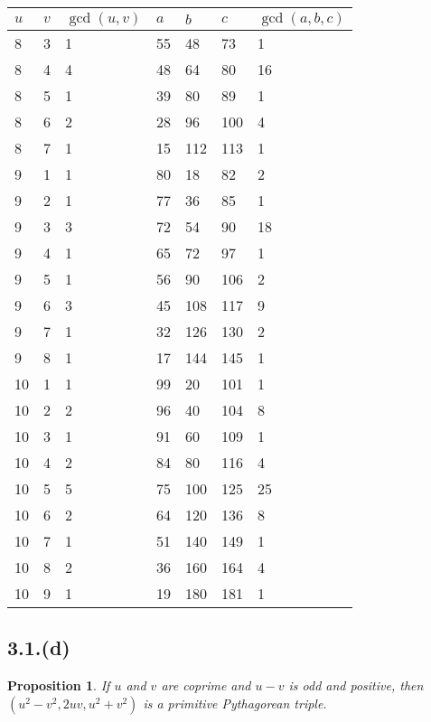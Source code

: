 \documentclass[letterpaper, 12pt]{memoir}
\theoremstyle{mystyle}
\newtheorem*{prop}{Proposition}
\begin{document}
\begin{tabular}{|l l l|l l l l|}
    \hline
    $u$ & $v$ & $\gcd (u, v)$  & $a$   & $b$   & $c$ & $\gcd(a,b,c)$  \\
    \hline
    8 & 3 & 1 & 55 & 48 & 73 & 1 \\
    8 & 4 & 4 & 48 & 64 & 80 & 16 \\
    8 & 5 & 1 & 39 & 80 & 89 & 1 \\
    8 & 6 & 2 & 28 & 96 & 100 & 4 \\
    8 & 7 & 1 & 15 & 112 & 113 & 1 \\
    9 & 1 & 1 & 80 & 18 & 82 & 2 \\
    9 & 2 & 1 & 77 & 36 & 85 & 1 \\
    9 & 3 & 3 & 72 & 54 & 90 & 18 \\
    9 & 4 & 1 & 65 & 72 & 97 & 1 \\
    9 & 5 & 1 & 56 & 90 & 106 & 2 \\
    9 & 6 & 3 & 45 & 108 & 117 & 9 \\
    9 & 7 & 1 & 32 & 126 & 130 & 2 \\
    9 & 8 & 1 & 17 & 144 & 145 & 1 \\
    10 & 1 & 1 & 99 & 20 & 101 & 1 \\
    10 & 2 & 2 & 96 & 40 & 104 & 8 \\
    10 & 3 & 1 & 91 & 60 & 109 & 1 \\
    10 & 4 & 2 & 84 & 80 & 116 & 4 \\
    10 & 5 & 5 & 75 & 100 & 125 & 25 \\
    10 & 6 & 2 & 64 & 120 & 136 & 8 \\
    10 & 7 & 1 & 51 & 140 & 149 & 1 \\
    10 & 8 & 2 & 36 & 160 & 164 & 4 \\
    10 & 9 & 1 & 19 & 180 & 181 & 1 \\
    \hline
\end{tabular}


\subsection*{3.1.(d)}
\begin{prop}
    If $u$ and $v$ are coprime and $u-v$ is odd and positive, then $(u^2-v^2,
    2uv, u^2+v^2)$ is a primitive Pythagorean triple.
\end{prop}
\end{document}
